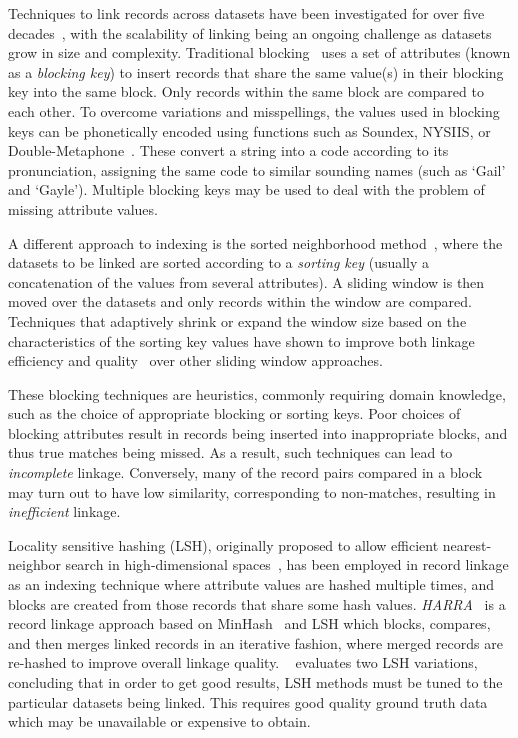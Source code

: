 \documentclass{llncs}
\begin{document}
Techniques to link records across datasets have been investigated for
over five decades~\cite{Fel69,New59}, with the scalability of linking
being an ongoing challenge as datasets grow in size and complexity.
Traditional blocking~\cite{Chr12b} uses a set of attributes (known as a
\emph{blocking key}) to insert records that share the same value(s) in
their blocking key into the same block. Only records within the same
block are  compared to each other. To overcome variations and
misspellings, the values used in blocking keys can be phonetically
encoded using functions such as Soundex, NYSIIS, or
Double-Metaphone~\cite{Chr12}. These convert a string into a code
according to its pronunciation, assigning the same code to similar
sounding names (such as `Gail' and `Gayle'). Multiple blocking keys may
be used to deal with the problem of missing attribute values.

A different approach to indexing is the sorted neighborhood
method~\cite{Mon96}, where the datasets to be linked are sorted
according to a \emph{sorting key} (usually a concatenation of the values
from several attributes). A sliding window is then moved over the
datasets and only records within the window are compared. Techniques
that adaptively shrink or expand the window size based on the
characteristics of the sorting key values have shown to improve both
linkage efficiency and quality~\cite{Dra12} over other sliding window
approaches.

These blocking techniques are heuristics, commonly requiring domain
knowledge, such as the choice of appropriate blocking or sorting keys.
Poor choices of blocking attributes result in records being inserted
into inappropriate blocks, and thus true matches being missed. As a
result, such techniques can lead to \emph{incomplete} linkage.
Conversely, many of the record pairs compared in a block may turn
out to have low similarity, corresponding to non-matches, resulting in
\emph{inefficient} linkage.

Locality sensitive hashing (LSH), originally proposed to allow efficient
nearest-neighbor search in high-dimensional spaces~\cite{Ind98}, has
been employed in record linkage as an indexing technique where attribute
values are hashed multiple times, and blocks are created from those
records that share some hash values. \emph{HARRA}~\cite{Kim10} is a
record linkage approach based on MinHash~\cite{Broder1997} and LSH which
blocks, compares, and then merges linked records in an iterative
fashion, where merged records are re-hashed to improve overall linkage
quality. ~\cite{Steorts2014} evaluates two LSH variations, concluding
that in order to get good results, LSH methods must be tuned to the
particular datasets being linked. This requires good quality ground
truth data which may be unavailable or expensive to obtain.
\end{document}
